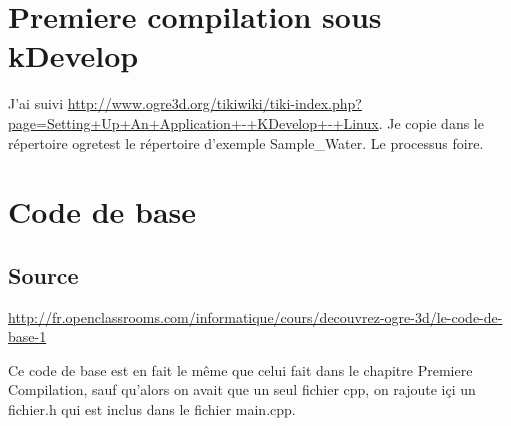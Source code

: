 \section{Premiere compilation sous kDevelop}
J'ai suivi\newline
\url{http://www.ogre3d.org/tikiwiki/tiki-index.php?page=Setting+Up+An+Application+-+KDevelop+-+Linux}.\newline
Je copie dans le r\'epertoire ogretest le r\'epertoire d'exemple Sample\_Water. Le processus foire.




\section{Code de base}
\subsection{Source}
\url{http://fr.openclassrooms.com/informatique/cours/decouvrez-ogre-3d/le-code-de-base-1}

Ce code de base est en fait le m\^eme que celui fait dans le chapitre Premiere Compilation, sauf qu'alors on avait que un seul fichier cpp, on rajoute i\c{c}i un fichier.h qui est inclus dans le fichier main.cpp.


